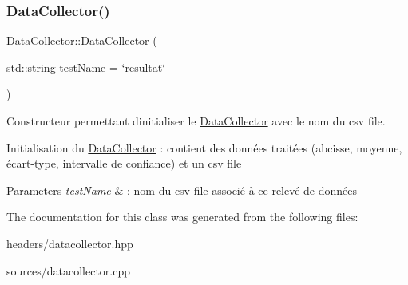 \subsubsection{\texorpdfstring{Data\+Collector()}{DataCollector()}}
{\footnotesize\ttfamily Data\+Collector\+::\+Data\+Collector (\begin{DoxyParamCaption}\item[{std\+::string}]{test\+Name = {\ttfamily \char`\"{}resultat\char`\"{}} }\end{DoxyParamCaption})}



Constructeur permettant d\textquotesingle{}initialiser le \hyperlink{classDataCollector}{Data\+Collector} avec le nom du csv file. 

Initialisation du \hyperlink{classDataCollector}{Data\+Collector} \+: contient des données traitées (abcisse, moyenne, écart-\/type, intervalle de confiance) et un csv file 
\begin{DoxyParams}{Parameters}
{\em test\+Name} & \+: nom du csv file associé à ce relevé de données \\
\hline
\end{DoxyParams}


The documentation for this class was generated from the following files\+:\begin{DoxyCompactItemize}
\item 
headers/datacollector.\+hpp\item 
sources/datacollector.\+cpp\end{DoxyCompactItemize}
